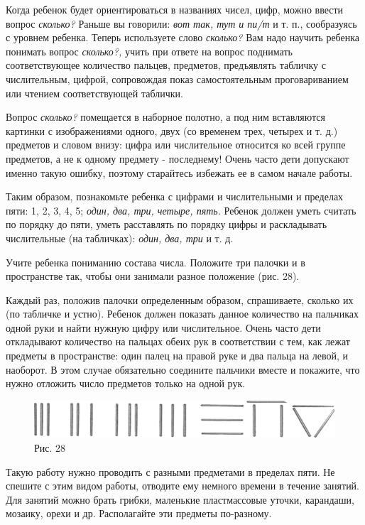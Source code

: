 \documentclass{book}
\renewcommand{\emph}[1]{\textit{#1}}
\begin{document}
Когда ребенок будет ориентироваться в названиях чисел, цифр, можно
ввести вопрос \emph{сколько?} Раньше вы говорили: \emph{вот так, тут и
пи/т} и т. п., сообразуясь с уровнем ребенка. Теперь используете слово
\emph{сколько?} Вам надо научить ребенка понимать вопрос
\emph{сколько?,} учить при ответе на вопрос поднимать соответствующее
количество пальцев, предметов, предъявлять табличку с числительным,
цифрой, сопровождая показ самостоятельным проговариванием или чтением
соответствующей таблички.

Вопрос \emph{сколько?} помещается в наборное полотно, а под ним
вставляются картинки с изображениями одного, двух (со временем трех,
четырех и т. д.) предметов и словом внизу: цифра или числительное
относится ко всей группе предметов, а не к одному предмету - последнему!
Очень часто дети допускают именно такую ошибку, поэтому старайтесь
избежать ее в самом начале работы.

Таким образом, познакомьте ребенка с цифрами и числительными и пределах
пяти: 1, 2, 3, 4, 5; \emph{один, два, три, четыре, пять.} Ребенок должен
уметь считать по порядку до пяти, уметь расставлять по порядку цифры и
раскладывать числительные (на табличках): \emph{один, два, три} и т. д.

Учите ребенка пониманию состава числа. Положите три палочки и в
пространстве так, чтобы они занимали разное положение (рис. 28).

Каждый раз, положив палочки определенным образом, спрашиваете, сколько
их (по табличке и устно). Ребенок должен показать данное количество на
пальчиках одной руки и найти нужную цифру или числительное. Очень часто
дети откладывают количество на пальцах обеих рук в соответствии с тем,
как лежат предметы в пространстве: один палец на правой руке и два
пальца на левой, и наоборот. В этом случае обязательно соедините
пальчики вместе и покажите, что нужно отложить число предметов только на
одной рук.

\begin{figure}
\centering
\includegraphics[width=\linewidth]{media/media/image25.png}
\caption*{Рис. 28}
\end{figure}

Такую работу нужно проводить с разными предметами в пределах пяти. Не
спешите с этим видом работы, отводите ему немного времени в течение
занятий. Для занятий можно брать грибки, маленькие пластмассовые уточки,
карандаши, мозаику, орехи и др. Располагайте эти предметы по-разному.
\end{document}
